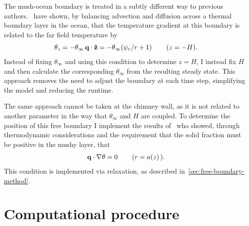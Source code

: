 \documentclass[11pt]{proc}
\begin{document}
The mush-ocean boundary is treated in a subtly different way to previous authors.~\citet*{schulze-worster-98} have shown, by balancing advection and diffusion across a thermal boundary layer in the ocean, that the temperature gradient at this boundary is related to the far field temperature by
\begin{equation}
\theta_z = - \theta_\infty \, \mathbf{q} \cdot \mathbf{\hat{z}} = - \theta_\infty (\psi_r/r + 1) \hspace{5ex} (z=-H).
\end{equation}
Instead of fixing $\theta_\infty$ and using this condition to determine $z=H$, I instead fix $H$ and then calculate the corresponding $\theta_\infty$ from the resulting steady state. This approach removes the need to adjust the boundary at each time step, simplifying the model and reducing the runtime.

The same approach cannot be taken at the chimney wall, as it is not related to another parameter in the way that $\theta_\infty$ and $H$ are coupled. To determine the position of this free boundary I implement the results of~\citet*{schulze-worster-99} who showed, through thermodynamic considerations and the requirement that the solid fraction must be positive in the mushy layer, that  
\begin{equation}
\label{eq:chimney-bc}
\mathbf{q} \cdot \nabla \theta = 0 \hspace{5ex} (r=a(z) \, ).
\end{equation}
This condition is implemented via relaxation, as described in~\autoref{sec:free-boundary-method}.

\section{Computational procedure}
\label{sec:computational-procedure}
\end{document}
